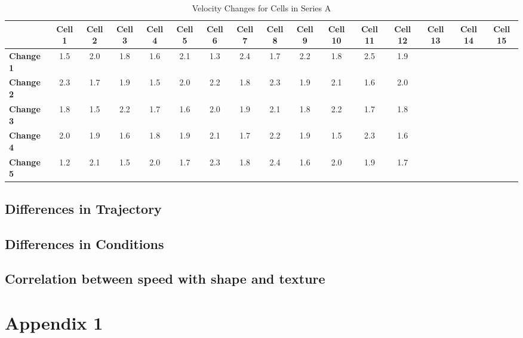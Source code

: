 \documentclass{article}
\begin{document}
\begin{landscape} %
\begin{table}[htbp]
\centering
\caption{Velocity Changes for Cells in Series A }
\label{tab:velocity_changes}
\begin{tabular}{|l|c|c|c|c|c|c|c|c|c|c|c|c|c|c|c|}
\hline
 & \textbf{Cell 1} & \textbf{Cell 2} & \textbf{Cell 3} & \textbf{Cell 4} & \textbf{Cell 5} & \textbf{Cell 6} & \textbf{Cell 7} & \textbf{Cell 8} & \textbf{Cell 9} & \textbf{Cell 10} & \textbf{Cell 11} & \textbf{Cell 12} & \textbf{Cell 13} & \textbf{Cell 14} & \textbf{Cell 15} \\
\hline
\textbf{Change 1} & 1.5 & 2.0 & 1.8 & 1.6 & 2.1 & 1.3 & 2.4 & 1.7 & 2.2 & 1.8 & 2.5 & 1.9 \\
\hline
\textbf{Change 2} & 2.3 & 1.7 & 1.9 & 1.5 & 2.0 & 2.2 & 1.8 & 2.3 & 1.9 & 2.1 & 1.6 & 2.0 \\
\hline
\textbf{Change 3} & 1.8 & 1.5 & 2.2 & 1.7 & 1.6 & 2.0 & 1.9 & 2.1 & 1.8 & 2.2 & 1.7 & 1.8 \\
\hline
\textbf{Change 4} & 2.0 & 1.9 & 1.6 & 1.8 & 1.9 & 2.1 & 1.7 & 2.2 & 1.9 & 1.5 & 2.3 & 1.6 \\
\hline
\textbf{Change 5} & 1.2 & 2.1 & 1.5 & 2.0 & 1.7 & 2.3 & 1.8 & 2.4 & 1.6 & 2.0 & 1.9 & 1.7 \\
\hline
\end{tabular}
\end{table}
\end{landscape} %



\subsection*{Differences in Trajectory}
\subsection*{Differences in Conditions}
\subsection*{Correlation between speed with shape and texture}
\section*{Appendix 1}
\end{document}
